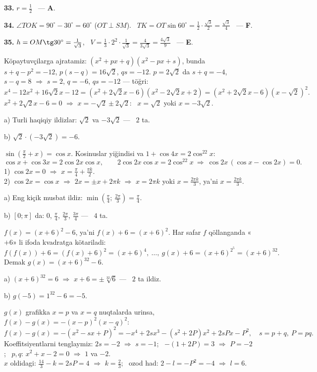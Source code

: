 \textbf{33.} $r=\frac12$ \ — \textbf{A}.

\textbf{34.} $\angle TOK=90^\circ-30^\circ=60^\circ$ ($OT\perp SM$). \ $TK=OT\sin60^\circ=\frac12\cdot\frac{\sqrt3}2=\frac{\sqrt3}4$ \ — \textbf{F}.

\textbf{35.} $h=OM\tg30^\circ=\frac1{\sqrt3}$, \ $V=\frac13\cdot2^2\cdot\frac1{\sqrt3}=\frac4{3\sqrt3}=\frac{4\sqrt3}9$ \ — \textbf{E}.

\newpage
{}
Köpaytuvçilarga ajratamiz: $(x^2+px+q)(x^2-px+s)$, bunda $s+q-p^2=-12$, $p(s-q)=16\sqrt2$, $qs=-12$. $p=2\sqrt2$ da $s+q=-4$, $s-q=8$ $\Rightarrow$ $s=2$, $q=-6$, $qs=-12$ — töğri:
\[x^4-12x^2+16\sqrt2x-12=\left(x^2+2\sqrt2x-6\right)\left(x^2-2\sqrt2x+2\right)=\left(x^2+2\sqrt2x-6\right)\left(x-\sqrt2\right)^2.\]
$x^2+2\sqrt2x-6=0$ $\Rightarrow$ $x=-\sqrt2\pm2\sqrt2$: \ $x=\sqrt2$ yoki $x=-3\sqrt2$.

a) Turli haqiqiy ildizlar: $\sqrt2$ va $-3\sqrt2$ — \ $2$ ta.

b) $\sqrt2\cdot(-3\sqrt2)=-6$.

\newpage
{}
$\sin\left(\frac\pi2+x\right)=\cos x$. Kosinuslar yiğindisi va $1+\cos4x=2\cos^22x$:
\[\cos x+\cos3x=2\cos2x\cos x,\qquad 2\cos2x\cos x=2\cos^22x\ \Rightarrow\ \cos2x\,(\cos x-\cos2x)=0.\]
1) $\cos2x=0$ $\Rightarrow$ $x=\frac\pi4+\frac{\pi k}2$.\\
2) $\cos2x=\cos x$ $\Rightarrow$ $2x=\pm x+2\pi k$ $\Rightarrow$ $x=2\pi k$ yoki $x=\frac{2\pi k}3$, ya'ni $x=\frac{2\pi k}3$.

a) Eng kiçik musbat ildiz: $\min\left(\frac\pi4;\ \frac{2\pi}3\right)=\frac\pi4$.

b) $[0;\pi]$ da: $0$, $\frac\pi4$, $\frac{2\pi}3$, $\frac{3\pi}4$ — \ $4$ ta.

\newpage
{}
$f(x)=(x+6)^2-6$, ya'ni $f(x)+6=(x+6)^2$. Har safar $f$ qöllanganda «$+6$» li ifoda kvadratga kötariladi:
\[f(f(x))+6=\left(f(x)+6\right)^2=(x+6)^4,\ \ldots,\ g(x)+6=(x+6)^{2^5}=(x+6)^{32}.\]
Demak $g(x)=(x+6)^{32}-6$.

a) $(x+6)^{32}=6$ $\Rightarrow$ $x+6=\pm\sqrt[32]6$ — \ $2$ ta ildiz.

b) $g(-5)=1^{32}-6=-5$.

\newpage
{}
$g(x)$ grafikka $x=p$ va $x=q$ nuqtalarda urinsa, $f(x)-g(x)=-(x-p)^2(x-q)^2$:
\[f(x)-g(x)=-\left(x^2-sx+P\right)^2=-x^4+2sx^3-(s^2+2P)x^2+2sPx-P^2,\quad s=p+q,\ P=pq.\]
Koeffitsiyentlarni tenglaymiz: $2s=-2$ $\Rightarrow$ $s=-1$; \ $-(1+2P)=3$ $\Rightarrow$ $P=-2$; \ $p,q$: $x^2+x-2=0$ $\Rightarrow$ $1$ va $-2$.\\
$x$ oldidagi: $\frac{14}3-k=2sP=4$ $\Rightarrow$ $k=\frac23$; \ ozod had: $2-l=-P^2=-4$ $\Rightarrow$ $l=6$.

